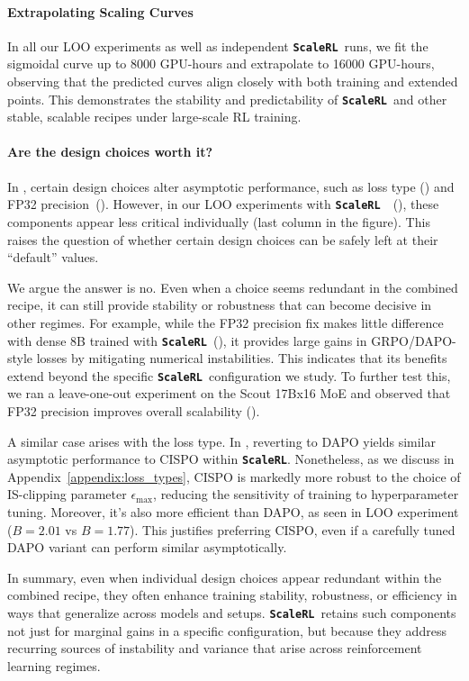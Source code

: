 \documentclass[]{fairmeta} %
\newcommand{\scalerl}{\texttt{\textbf{ScaleRL}}}
\begin{document}
\paragraph{Extrapolating Scaling Curves}
In all our LOO experiments as well as independent \scalerl\ runs, we fit the sigmoidal curve up to 8000 GPU-hours and extrapolate to 16000 GPU-hours, observing that the predicted curves align closely with both training and extended points. This demonstrates the stability and predictability of \scalerl\ and other stable, scalable recipes under large-scale RL training.

\paragraph{Are the design choices worth it?}
In , certain design choices alter asymptotic performance, such as loss type () and FP32 precision~(). However, in our LOO experiments with \scalerl\ ~(), these components appear less critical individually (last column in the figure). 
This raises the question of whether certain design choices can be safely left at their ``default'' values. 

We argue the answer is no. Even when a choice seems redundant in the combined recipe, it can still provide stability or robustness that can become decisive in other regimes. 
For example, while the FP32 precision fix makes little difference with dense 8B trained with \scalerl\ (), it provides large gains in GRPO/DAPO-style losses by mitigating numerical instabilities. This indicates that its benefits extend beyond the specific \scalerl\ configuration we study. To further test this, we ran a leave-one-out experiment on the Scout 17Bx16 MoE and observed that FP32 precision improves overall scalability (). 

A similar case arises with the loss type. In , reverting to DAPO yields similar asymptotic performance to CISPO within \scalerl. 
Nonetheless, as we discuss in Appendix~\ref{appendix:loss_types}, CISPO is markedly more robust to the choice of IS-clipping parameter $\epsilon_{\max}$, reducing the sensitivity of training to hyperparameter tuning. Moreover, it's also more efficient than DAPO, as seen in LOO experiment ($B=2.01$ vs $B=1.77$).
This justifies preferring CISPO, even if a carefully tuned DAPO variant can perform similar asymptotically. 

In summary, even when individual design choices appear redundant within the combined recipe, they often enhance training stability, robustness, or efficiency in ways that generalize across models and setups. \scalerl\ retains such components not just for marginal gains in a specific configuration, but because they address recurring sources of instability and variance that arise across reinforcement learning regimes.
\end{document}
